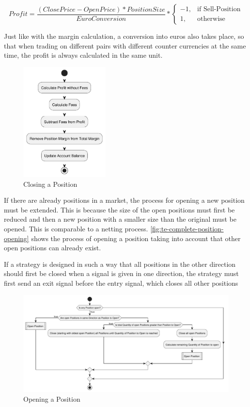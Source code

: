 \[
    Profit = \frac{(ClosePrice - OpenPrice) * PositionSize}{EuroConversion} *
    \begin{cases}
        -1,& \text{if Sell-Position}\\
        1,              & \text{otherwise}
    \end{cases}
\]

\noindent
Just like with the margin calculation, a conversion into euros also takes place, so that when trading on different pairs with different counter currencies at the same time, the profit is always calculated in the same unit.

\begin{figure}[H]
    \centering
    \includegraphics[width=0.4\textwidth]{images/trading-engine/position-closing}
    \caption{Closing a Position}
    \label{fig:te-position-closing}
\end{figure}

\noindent
If there are already positions in a market, the process for opening a new position must be extended.
This is because the size of the open positions must first be reduced and then a new position with a smaller size than the original must be opened.
This is comparable to a netting process.
\autoref{fig:te-complete-position-opening} shows the process of opening a position taking into account that other open positions can already exist.

If a strategy is designed in such a way that all positions in the other direction should first be closed when a signal is given in one direction, the strategy must first send an exit signal before the entry signal, which closes all other positions


\begin{figure}[H]
    \centering
    \includegraphics[width=\textwidth]{images/trading-engine/complete-position-opening}
    \caption{Opening a Position}
    \label{fig:te-complete-position-opening}
\end{figure}

